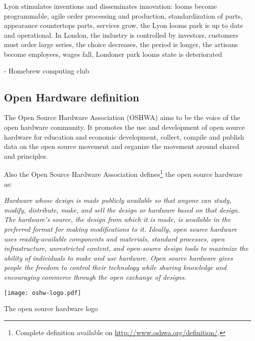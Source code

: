 Lyon stimulates inventions and disseminates innovation: looms become programmable, agile order processing and production, standardization of parts, appearance countertops parts, services grow, the Lyon looms park is up to date and operational.
In London, the industry is controlled by investors, customers must order large series, the choice decreases, the period is longer, the artisans become employees, wages fall, Londoner park looms state is deteriorated


- Homebrew computing club
\subsection{Open Hardware definition} %

The Open Source Hardware Association (OSHWA) aims to be the voice of the open hardware community. It promotes the use and development of open source hardware for education and economic development, collect, compile and publish data on the open source movement and organize the movement around shared and principles.

Also the Open Source Hardware Association defines\footnote{Complete definition available on \url{http://www.oshwa.org/definition/}.} the open source hardware as:

\begin{row}{4}{2}
    \begin{cell}{3}
        \emph{Hardware whose design is made publicly available so that anyone can study, modify, distribute, make, and sell the design or hardware based on that design. The hardware’s source, the design from which it is made, is available in the preferred format for making modifications to it. Ideally, open source hardware uses readily-available components and materials, standard processes, open infrastructure, unrestricted content, and open-source design tools to maximize the ability of individuals to make and use hardware. Open source hardware gives people the freedom to control their technology while sharing knowledge and encouraging commerce through the open exchange of designs.}
    \end{cell}
    \begin{cell}{1}
        \begin{NFfigure}
            \centering
                \texttt{[image: oshw-logo.pdf]}
            \caption{The open source hardware logo}
            \label{fig:ohw-logo}
        \end{NFfigure}
    \end{cell}
\end{row}



